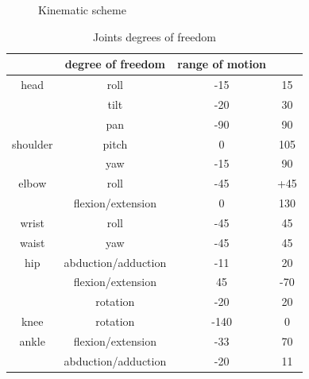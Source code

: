 \documentclass[letterpaper, 10 pt, conference]{ieeeconf}  %
\begin{document}
 \begin{figure}[thpb]
      \centering
      \caption{Kinematic scheme}
      \label{img:kinematic}
   \end{figure}
 

\begin{table}[thpb]
    \caption{Joints degrees of freedom}
    \label{tbl:DOFTable}
    \begin{center}
    \begin{tabular}{c | c c c}
        & degree of freedom & range of motion & \\
    \hline
        head & roll & -15 & 15 \\
            & tilt & -20 & 30 \\
            & pan & -90 & 90 \\
    \hline
        shoulder &  pitch & 0 & 105\\
                & yaw & -15 & 90\\
    \hline
        elbow & roll & -45 & +45 \\
                & flexion/extension & 0 & 130\\ 
    \hline
        wrist & roll & -45 & 45 \\
    \hline
        waist & yaw & -45 & 45 \\
    \hline
        hip & abduction/adduction & -11 & 20 \\
            & flexion/extension & 45 & -70 \\
            & rotation &-20 & 20\\
    \hline
        knee & rotation & -140 & 0 \\
    \hline
        ankle & flexion/extension & -33 & 70 \\
            & abduction/adduction & -20 & 11\\
    \end{tabular}
    \end{center}
\end{table}
\end{document}
